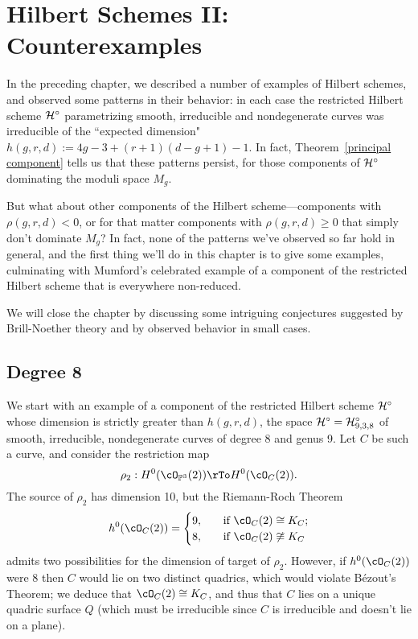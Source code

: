 \chapter{Hilbert Schemes II: Counterexamples} 

In the preceding chapter, we described a number of examples of Hilbert schemes, and observed some patterns in their behavior: in each case the restricted Hilbert scheme $\cH^\circ$ parametrizing smooth, irreducible and nondegenerate curves was irreducible of the ``expected dimension" $h(g,r,d) :=  4g-3 + (r+1)(d-g+1) - 1$. In fact, Theorem~\ref{principal component} tells us that these patterns persist, for those components of $\cH^\circ$ dominating the moduli space $M_g$.

But what about other components of the Hilbert scheme---components with $\rho(g,r,d) < 0$, or for that matter components with $\rho(g,r,d) \geq 0$ that simply don't dominate $M_g$? In fact, none of the patterns we've observed so far hold in general, and the first thing we'll do in this chapter is to give some examples, culminating with Mumford's celebrated example of a component of the restricted Hilbert scheme that is everywhere non-reduced.


We will close the chapter by discussing some intriguing conjectures suggested by Brill-Noether theory and by observed behavior in small cases.


\section{Degree 8}\label{degree 8 section}

We start with an example of a component of the restricted Hilbert scheme $\cH^\circ$ whose dimension is strictly greater than $h(g,r,d)$, the space $\cH^\circ = \cH^\circ_{9,3,8}$ of smooth, irreducible, nondegenerate curves of degree 8 and genus 9. Let $C$ be such a curve, and consider the restriction map
$$
\rho_2 : H^0(\cO_{\PP^3}(2)) \rTo H^0(\cO_C(2)).
$$
The source of $\rho_2$ has dimension 10, but the Riemann-Roch Theorem
\begin{align*}
h^0(\cO_C(2)) =
\begin{cases}
9, \quad &\text{if } \cO_C(2) \cong K_C; \\
8,  \quad &\text{if } \cO_C(2) \not\cong K_C
\end{cases}
\end{align*}
admits two possibilities for the dimension of target of $\rho_2$.
However, if $h^0(\cO_C(2))$ were 8 then $C$ would  lie on two distinct quadrics, which would violate B\'ezout's Theorem; we deduce that $\cO_C(2) \cong K_C$, and thus that $C$ lies on a unique quadric surface $Q$ (which must be irreducible since $C$ is irreducible and doesn't lie on a plane).

